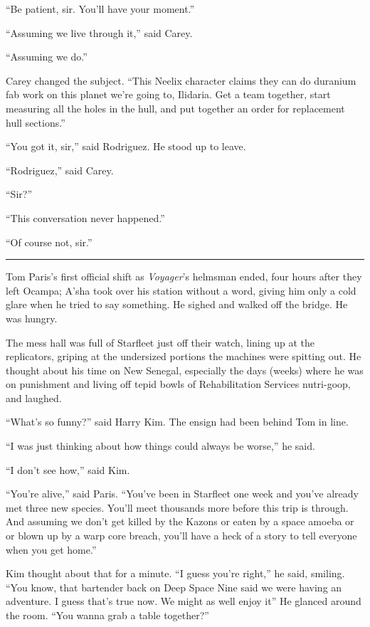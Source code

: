 \documentclass[twoside,letterpaper,12pt]{memoir}
\begin{document}
``Be patient, sir. You’ll have your moment.” 

``Assuming we live through it,” said Carey. 

``Assuming we do.” 

Carey changed the subject. ``This Neelix character claims they can do duranium fab work on this planet we’re going to, Ilidaria. Get a team together, start measuring all the holes in the hull, and put together an order for replacement hull sections.” 

``You got it, sir,” said Rodriguez. He stood up to leave. 

``Rodriguez,” said Carey. 

``Sir?” 

``This conversation never happened.” 

``Of course not, sir.” 

\begin{center}\rule{3cm}{0.4 pt}\end{center} 

Tom Paris’s first official shift as \textit{Voyager}’s helmsman ended, four hours after they left Ocampa; A’sha took over his station without a word, giving him only a cold glare when he tried to say something. He sighed and walked off the bridge. He was hungry. 

The mess hall was full of Starfleet just off their watch, lining up at the replicators, griping at the undersized portions the machines were spitting out. He thought about his time on New Senegal, especially the days (weeks) where he was on punishment and living off tepid bowls of Rehabilitation Services nutri-goop, and laughed. 

``What’s so funny?” said Harry Kim. The ensign had been behind Tom in line. 

``I was just thinking about how things could always be worse,” he said. 

``I don’t see how,” said Kim. 

``You’re alive,” said Paris. ``You’ve been in Starfleet one week and you’ve already met three new species. You’ll meet thousands more before this trip is through. And assuming we don’t get killed by the Kazons or eaten by a space amoeba or or blown up by a warp core breach, you’ll have a heck of a story to tell everyone when you get home.” 

Kim thought about that for a minute. ``I guess you’re right,” he said, smiling. ``You know, that bartender back on Deep Space Nine said we were having an adventure. I guess that’s true now. We might as well enjoy it” He glanced around the room. ``You wanna grab a table together?” 
\end{document}
